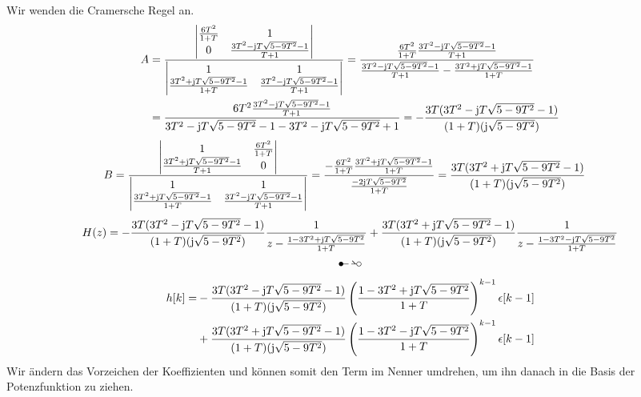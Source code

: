 \documentclass[11pt,a4paper,DIV=12]{scrartcl}
\begin{document}
Wir wenden die Cramersche Regel an.
\begin{align}
	A&=\frac{\begin{vmatrix}
			\frac{6T^2}{1+T} & 1\\
			0 & \frac{3T^2-\im T \sqrt{5-9T^2}-1}{T+1}
	\end{vmatrix}}{\begin{vmatrix}
	1 & 1 \\
	\frac{3T^2+\im T\sqrt{5-9T^2}-1}{1+T} & \frac{3T^2-\im T \sqrt{5-9T^2}-1}{T+1}
\end{vmatrix}}=\frac{\frac{6T^2}{1+T}\frac{3T^2-\im T \sqrt{5-9T^2}-1}{T+1}}{\frac{3T^2-\im T \sqrt{5-9T^2}-1}{T+1}-\frac{3T^2+\im T\sqrt{5-9T^2}-1}{1+T}}\nonumber\\
&=\frac{6T^2\frac{3T^2-\im T \sqrt{5-9T^2}-1}{T+1}}{3T^2-\im T\sqrt{5-9T^2}-1-3T^2-\im T\sqrt{5-9T^2}+1}=-\frac{3T(3T^2-\im T\sqrt{5-9T^2}-1)}{(1+T)(\im\sqrt{5-9T^2})}
\end{align}
\begin{align}
	B&=\frac{\begin{vmatrix}
			1 & \frac{6T^2}{1+T}\\
			\frac{3T^2+\im T \sqrt{5-9T^2}-1}{T+1} & 0
	\end{vmatrix}}{\begin{vmatrix}
			1 & 1 \\
			\frac{3T^2+\im T\sqrt{5-9T^2}-1}{1+T} & \frac{3T^2-\im T \sqrt{5-9T^2}-1}{T+1}
	\end{vmatrix}}=\frac{-\frac{6T^2}{1+T}\frac{3T^2+\im T\sqrt{5-9T^2}-1}{1+T}}{\frac{-2\im T\sqrt{5-9T^2}}{1+T}}=\frac{3T(3T^2+\im T\sqrt{5-9T^2}-1)}{(1+T)(\im\sqrt{5-9T^2})}
\end{align}
\begin{gather}
	H(z)=-\frac{3T(3T^2-\im T\sqrt{5-9T^2}-1)}{(1+T)(\im\sqrt{5-9T^2})}\frac{1}{z-\frac{1-3T^2+\im T\sqrt{5-9T^2}}{1+T}}+\frac{3T(3T^2+\im T\sqrt{5-9T^2}-1)}{(1+T)(\im\sqrt{5-9T^2})}\frac{1}{z-\frac{1-3T^2-\im T\sqrt{5-9T^2}}{1+T}}\\
	\Ztransf\nonumber\\
\end{gather}
\begin{align}
	h[k]=&-\frac{3T(3T^2-\im T\sqrt{5-9T^2}-1)}{(1+T)(\im\sqrt{5-9T^2})}\left(\frac{1-3T^2+\im T\sqrt{5-9T^2}}{1+T}\right)^{k-1}\epsilon[k-1]\nonumber\\
	&+\frac{3T(3T^2+\im T\sqrt{5-9T^2}-1)}{(1+T)(\im\sqrt{5-9T^2})}\left(\frac{1-3T^2-\im T\sqrt{5-9T^2}}{1+T}\right)^{k-1}\epsilon[k-1]
\end{align}
Wir ändern das Vorzeichen der Koeffizienten und können somit den Term im Nenner umdrehen, um ihn danach in die Basis der Potenzfunktion zu ziehen.
\end{document}
